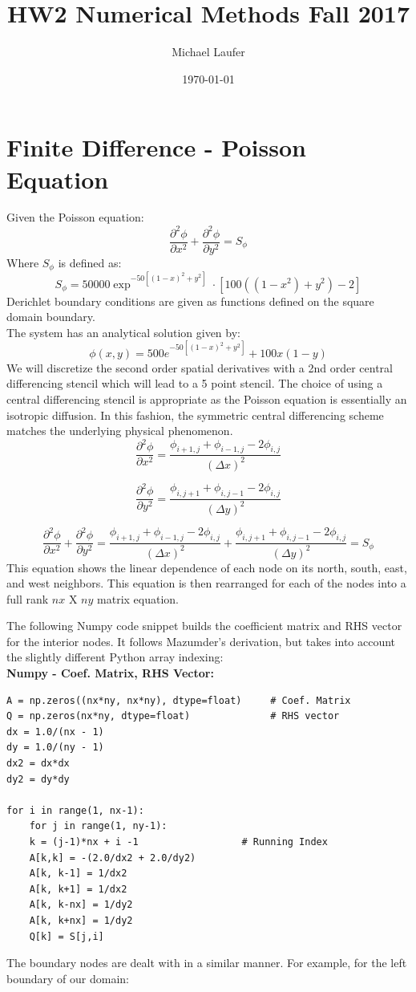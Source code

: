\documentclass[11pt]{article}
\author{Michael Laufer}
\date{\today}
\title{HW2 Numerical Methods Fall 2017}
\begin{document}
\maketitle
\section{Finite Difference - Poisson Equation}
\label{sec-1}
Given the Poisson equation:
\[
\frac{\partial^{2} \phi}{\partial x^{2}} + \frac{\partial^{2} \phi}{\partial y^{2}} = S_{\phi}
\]
Where $S_{\phi}$ is defined as:
\[
S_{\phi}=50000 \exp^{ -50 \left[ \left( 1 - x \right)^{2}  + y^{2} \right] } \cdot \left[ 100 \left( \left( 1-x^{2}  \right)  + y^{2} \right) -2 \right]
\]
Derichlet boundary conditions are given as functions defined on the square domain boundary. \\
The system has an analytical solution given by:
\[
\phi \left( x,y \right) = 500 e^{-50 \left[ \left(1-x \right)^{2} + y^{2}\right] } + 100x \left( 1-y \right)
\]
We will discretize the second order spatial derivatives with a 2nd order central differencing stencil which will lead to a 5 point stencil. The choice of using a central differencing stencil is appropriate as the Poisson equation is essentially an isotropic diffusion. In this fashion, the symmetric central differencing scheme matches the underlying physical phenomenon. 
\[
\frac{\partial^{2} \phi}{\partial x^{2}} = \frac{\phi_{i+1,j} + \phi_{i-1,j} -2\phi_{i,j} }{\left(\Delta x \right)^{2}}
\]

\[
\frac{\partial^{2} \phi}{\partial y^{2}} = \frac{\phi_{i,j+1} + \phi_{i,j-1} -2\phi_{i,j} }{\left(\Delta y \right)^{2}}
\]

\[
\frac{\partial^{2} \phi}{\partial x^{2}} + \frac{\partial^{2} \phi}{\partial y^{2}}  = \frac{\phi_{i+1,j} + \phi_{i-1,j} -2\phi_{i,j} }{\left(\Delta x \right)^{2}} + \frac{\phi_{i,j+1} + \phi_{i,j-1} -2\phi_{i,j} }{\left(\Delta y \right)^{2}} = S_{\phi} 
\]
This equation  shows the linear dependence of each node on its north, south, east, and west neighbors. 
This equation is then rearranged for each of the nodes into a full rank $nx$ X $ny$ matrix equation.

The following Numpy code snippet builds the coefficient matrix and RHS vector for the interior nodes. It follows Mazumder's derivation, but takes into account the slightly different Python array indexing: \\

\textbf{Numpy - Coef. Matrix, RHS Vector:} 
\begin{verbatim}
A = np.zeros((nx*ny, nx*ny), dtype=float)     # Coef. Matrix
Q = np.zeros(nx*ny, dtype=float)              # RHS vector
dx = 1.0/(nx - 1)
dy = 1.0/(ny - 1)
dx2 = dx*dx
dy2 = dy*dy

for i in range(1, nx-1):
    for j in range(1, ny-1):
	k = (j-1)*nx + i -1                  # Running Index
	A[k,k] = -(2.0/dx2 + 2.0/dy2)
	A[k, k-1] = 1/dx2
	A[k, k+1] = 1/dx2
	A[k, k-nx] = 1/dy2
	A[k, k+nx] = 1/dy2
	Q[k] = S[j,i]
\end{verbatim}
The boundary nodes are dealt with in a similar manner. For example, for the left boundary of our domain:  \\
\end{document}
